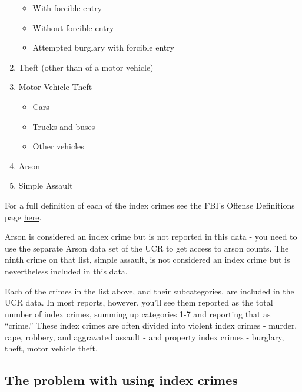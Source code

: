 \documentclass[
  12pt,
  openany]{book}
\providecommand{\tightlist}{%
  \setlength{\itemsep}{0pt}\setlength{\parskip}{0pt}}
\begin{document}
\begin{enumerate}
  \begin{itemize}
  \tightlist
  \item
    With forcible entry\\
  \item
    Without forcible entry\\
  \item
    Attempted burglary with forcible entry\\
  \end{itemize}
\item
  Theft (other than of a motor vehicle)\\
\item
  Motor Vehicle Theft

  \begin{itemize}
  \tightlist
  \item
    Cars\\
  \item
    Trucks and buses\\
  \item
    Other vehicles\\
  \end{itemize}
\item
  Arson\\
\item
  Simple Assault
\end{enumerate}

For a full definition of each of the index crimes see the FBI's Offense Definitions page \href{https://ucrdatatool.gov/offenses.cfm}{here}.

Arson is considered an index crime but is not reported in this data - you need to use the separate Arson data set of the UCR to get access to arson counts. The ninth crime on that list, simple assault, is not considered an index crime but is nevertheless included in this data.

Each of the crimes in the list above, and their subcategories, are included in the UCR data. In most reports, however, you'll see them reported as the total number of index crimes, summing up categories 1-7 and reporting that as ``crime.'' These index crimes are often divided into violent index crimes - murder, rape, robbery, and aggravated assault - and property index crimes - burglary, theft, motor vehicle theft.

\hypertarget{the-problem-with-using-index-crimes}{%
\subsection{The problem with using index crimes}\label{the-problem-with-using-index-crimes}}
\end{document}
